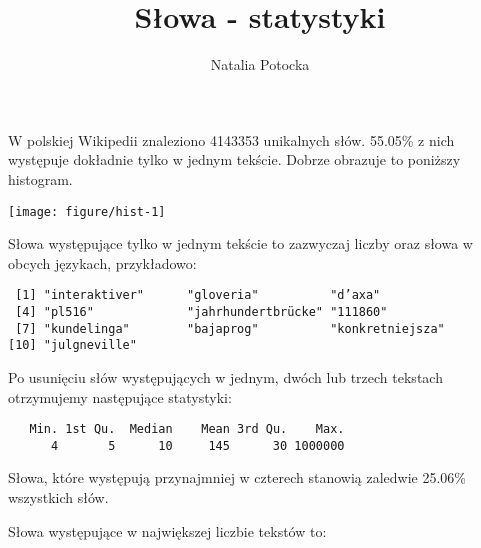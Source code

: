 \documentclass[12pt, twoside, openany]{report}\usepackage[]{graphicx}\usepackage[]{color}
\author{Natalia Potocka}
\title{Słowa - statystyki}
\makeatletter
\def\maxwidth{ %
  \ifdim\Gin@nat@width>\linewidth
    \linewidth
  \else
    \Gin@nat@width
  \fi
}
\newenvironment{kframe}{%
 \def\at@end@of@kframe{}%
 \ifinner\ifhmode%
  \def\at@end@of@kframe{\end{minipage}}%
  \begin{minipage}{\columnwidth}%
 \fi\fi%
 \def\FrameCommand##1{\hskip\@totalleftmargin \hskip-\fboxsep
 \colorbox{shadecolor}{##1}\hskip-\fboxsep
     \hskip-\linewidth \hskip-\@totalleftmargin \hskip\columnwidth}%
 \MakeFramed {\advance\hsize-\width
   \@totalleftmargin\z@ \linewidth\hsize
   \@setminipage}}%
 {\par\unskip\endMakeFramed%
 \at@end@of@kframe}
\newenvironment{knitrout}{}{} %
\theoremstyle{plain}
\makeatother
\begin{document}
\maketitle


\newpage






W polskiej Wikipedii znaleziono 4143353 unikalnych słów. 55.05\% z nich występuje dokładnie tylko w jednym tekście. Dobrze obrazuje to poniższy histogram.

\begin{knitrout}
\color{fgcolor}
\texttt{[image: figure/hist-1]} 

\end{knitrout}

Słowa występujące tylko w jednym tekście to zazwyczaj liczby oraz słowa w obcych językach, przykładowo:
\begin{knitrout}
\color{fgcolor}\begin{kframe}
\begin{verbatim}
 [1] "interaktiver"      "gloveria"          "d’axa"            
 [4] "pl516"             "jahrhundertbrücke" "111860"           
 [7] "kundelinga"        "bajaprog"          "konkretniejsza"   
[10] "julgneville"      
\end{verbatim}
\end{kframe}
\end{knitrout}

Po usunięciu słów występujących w jednym, dwóch lub trzech tekstach otrzymujemy następujące statystyki:

\begin{knitrout}
\color{fgcolor}\begin{kframe}
\begin{verbatim}
   Min. 1st Qu.  Median    Mean 3rd Qu.    Max. 
      4       5      10     145      30 1000000 
\end{verbatim}
\end{kframe}
\end{knitrout}


Słowa, które występują przynajmniej w czterech stanowią zaledwie 25.06\% wszystkich słów.

Słowa występujące w największej liczbie tekstów to:
\end{document}
